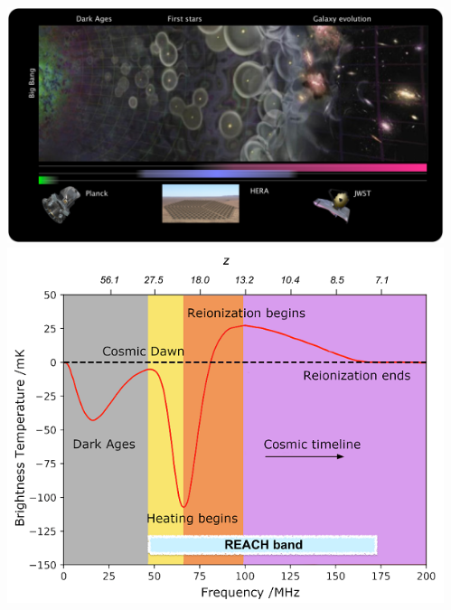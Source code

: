 \documentclass[aspectratio=169, handout]{beamer}
\begin{document}
\begin{frame}
\begin{columns}
\begin{itemize}
        \end{itemize}
        \includegraphics[width=\textwidth]{figures/21cm_1.png}
        \includegraphics[width=\textwidth]{figures/21cm.png}
    \end{columns}
\end{frame}
\end{document}
